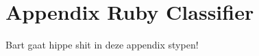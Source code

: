 \section{Appendix Ruby Classifier} \label{app:classifier}
Bart gaat hippe shit in deze appendix stypen!
\clearpage